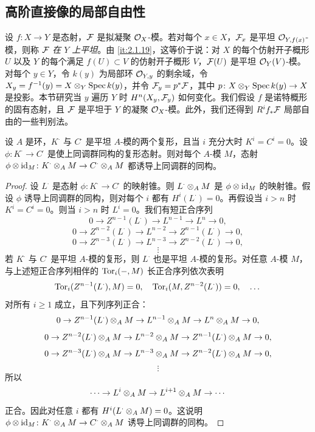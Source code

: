 
\subsection{高阶直接像的局部自由性}\label{sec:2.6}

设 $f\colon X\to Y$ 是态射，$\mathcal{F}$ 是拟凝聚 $\mathcal{O}_X$-模。若对每个 $x\in X$，$\mathcal{F}_x$ 是平坦 $\mathcal{O}_{Y,f(x)}$-模，则称 $\mathcal{F}$ \emph{在 $Y$ 上平坦}。由 \ref{it:2.1.19}，这等价于说：对 $X$ 的每个仿射开子概形 $U$ 以及 $Y$ 的每个满足 $f(U)\subset V$ 的仿射开子概形 $V$，$\mathcal{F}(U)$ 是平坦 $\mathcal{O}_Y(V)$-模。对每个 $y\in Y$，令 $k(y)$ 为局部环 $\mathcal{O}_{Y,y}$ 的剩余域，令 $X_y=f^{-1}(y)=X\otimes_Y\operatorname{Spec} k(y)$，并令 $\mathcal{F}_y=p^*\mathcal{F}$，其中 $p\colon X\otimes_Y\operatorname{Spec} k(y)\to X$ 是投影。本节研究当 $y$ 遍历 $Y$ 时 $H^n(X_y,\mathcal{F}_y)$ 如何变化。我们假设 $f$ 是诺特概形的固有态射，且 $\mathcal{F}$ 是平坦于 $Y$ 的凝聚 $\mathcal{O}_X$-模。此外，我们还得到 $R^if_*\mathcal{F}$ 局部自由的一些判别法。

\begin{lemma}\label{it:2.6.1}
设 $A$ 是环，$K^\cdot$ 与 $C^\cdot$ 是平坦 $A$-模的两个复形，且当 $i$ 充分大时 $K^i=C^i=0$。设 $\phi\colon K^\cdot\to C^\cdot$ 是使上同调群同构的复形态射。则对每个 $A$-模 $M$，态射 $\phi\otimes\operatorname{id}_M\colon K^\cdot\otimes_A M\to C^\cdot\otimes_A M$ 都诱导上同调群的同构。
\end{lemma}

\begin{proof}
设 $L^\cdot$ 是态射 $\phi\colon K^\cdot\to C^\cdot$ 的映射锥。则 $L^\cdot\otimes_A M$ 是 $\phi\otimes\operatorname{id}_M$ 的映射锥。假设 $\phi$ 诱导上同调群的同构，则对每个 $i$ 都有 $H^i(L^\cdot)=0$。再假设当 $i>n$ 时 $K^i=C^i=0$。则当 $i>n$ 时 $L^i=0$。我们有短正合序列
\[
0\to Z^{n-1}(L^\cdot)\to L^{n-1}\to L^n\to 0,
\]
\[
0\to Z^{n-2}(L^\cdot)\to L^{n-2}\to Z^{n-1}(L^\cdot)\to 0,
\]
\[
0\to Z^{n-3}(L^\cdot)\to L^{n-3}\to Z^{n-2}(L^\cdot)\to 0,
\]
\[\vdots\]
若 $K^\cdot$ 与 $C^\cdot$ 是平坦 $A$-模的复形，则 $L^\cdot$ 也是平坦 $A$-模的复形。对任意 $A$-模 $M$，与上述短正合序列相伴的 $\operatorname{Tor}_i(-,M)$ 长正合序列依次表明
\[
\operatorname{Tor}_i(Z^{n-1}(L^\cdot),M)=0,\quad \operatorname{Tor}_i(M,Z^{n-2}(L^\cdot))=0,\quad\dots
\]
对所有 $i\ge 1$ 成立，且下列序列正合：
\[
0\to Z^{n-1}(L^\cdot)\otimes_A M\to L^{n-1}\otimes_A M\to L^n\otimes_A M\to 0,
\]
\[
0\to Z^{n-2}(L^\cdot)\otimes_A M\to L^{n-2}\otimes_A M\to Z^{n-1}(L^\cdot)\otimes_A M\to 0,
\]
\[
0\to Z^{n-3}(L^\cdot)\otimes_A M\to L^{n-3}\otimes_A M\to Z^{n-2}(L^\cdot)\otimes_A M\to 0,
\]
\[\vdots\]
所以
\[
\cdots\to L^i\otimes_A M\to L^{i+1}\otimes_A M\to\cdots
\]
正合。因此对任意 $i$ 都有 $H^i(L^\cdot\otimes_A M)=0$。这说明 $\phi\otimes\operatorname{id}_M\colon K^\cdot\otimes_A M\to C^\cdot\otimes_A M$ 诱导上同调群的同构。
\end{proof}

